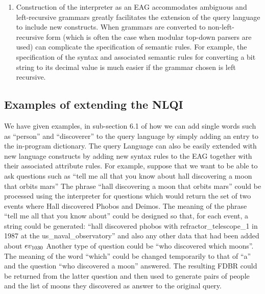 \documentclass[../main.tex]{subfiles}
\begin{document}
\begin{refsection}
\begin{enumerate}
	\item Construction of the interpreter as an EAG accommodates ambiguous and left-recursive
	grammars greatly facilitates the extension of the query language to include new 
	constructs. When grammars are converted to non-left-recursive
	form (which is often the case when modular top-down parsers are used) can complicate the
	specification of semantic rules. For example, the specification of the syntax and associated
	semantic rules for converting a bit string to its decimal value is much easier if the grammar
	chosen is left recursive.
\end{enumerate}

\subsection{Examples of extending the NLQI}

We have given examples, in sub-section 6.1 of how we can add single words such as ``person'' and
``discoverer'' to the query language by simply adding an entry to the in-program dictionary.
The query Language can also be easily extended with new language constructs by adding new syntax
rules to the EAG together with their associated attribute rules. For example, suppose that we want to be able to ask questions such as ``tell me all that you
know about hall discovering a moon that orbits mars'' The phrase ``hall discovering a moon that orbits
mars'' could be processed using the interpreter for questions which would return the set of two events
where Hall discovered Phobos and Deimos. The meaning of the phrase ``tell me all that
you know about'' could be designed so that, for each event, a string could be generated: ``hall discovered phobos with refractor\_telescope\_1 in 1987 at the us\_naval\_observatory''
and also any other data that had been added about $ev_{\mathrm{1030}}$
Another type of question could be ``who discovered which moons''. The meaning of the word ``which''
could be changed temporarily to that of ``a'' and the question ``who discovered a moon'' answered. The
resulting FDBR could be returned from the latter question and then used to generate pairs of people and
the list of moons they discovered as answer to the original query.


\end{refsection}
\end{document}
